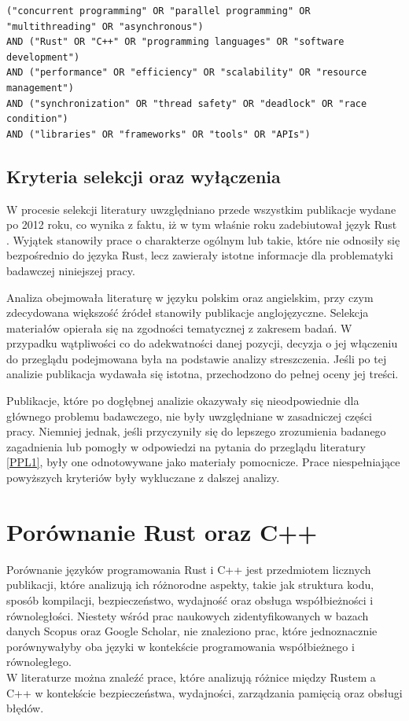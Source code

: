 \lstset{breaklines=true}
\begin{lstlisting}[caption=Kwerenda wygenerowana przez AI, label=AIQuery]
("concurrent programming" OR "parallel programming" OR "multithreading" OR "asynchronous")
AND ("Rust" OR "C++" OR "programming languages" OR "software development")
AND ("performance" OR "efficiency" OR "scalability" OR "resource management")
AND ("synchronization" OR "thread safety" OR "deadlock" OR "race condition")
AND ("libraries" OR "frameworks" OR "tools" OR "APIs")
\end{lstlisting}

\subsection{Kryteria selekcji oraz wyłączenia}
W procesie selekcji literatury uwzględniano przede wszystkim publikacje wydane po 2012 roku, co wynika z faktu, iż w tym właśnie roku zadebiutował język Rust \cite{wikipediaRustprogramming}. Wyjątek stanowiły prace o charakterze ogólnym lub takie, które nie odnosiły się bezpośrednio do języka Rust, lecz zawierały istotne informacje dla problematyki badawczej niniejszej pracy.

Analiza obejmowała literaturę w języku polskim oraz angielskim, przy czym zdecydowana większość źródeł stanowiły publikacje anglojęzyczne. Selekcja materiałów opierała się na zgodności tematycznej z zakresem badań. W przypadku wątpliwości co do adekwatności danej pozycji, decyzja o jej włączeniu do przeglądu podejmowana była na podstawie analizy streszczenia. Jeśli po tej analizie publikacja wydawała się istotna, przechodzono do pełnej oceny jej treści.

Publikacje, które po dogłębnej analizie okazywały się nieodpowiednie dla głównego problemu badawczego, nie były uwzględniane w zasadniczej części pracy. Niemniej jednak, jeśli przyczyniły się do lepszego zrozumienia badanego zagadnienia lub pomogły w odpowiedzi na pytania do przeglądu literatury \ref{PPL1}, były one odnotowywane jako materiały pomocnicze. Prace niespełniające powyższych kryteriów były wykluczane z dalszej analizy.

\section{Porównanie Rust oraz C++}
Porównanie języków programowania Rust i C++ jest przedmiotem licznych publikacji, które analizują ich różnorodne aspekty, takie jak struktura kodu, sposób kompilacji, bezpieczeństwo, wydajność oraz obsługa współbieżności i równoległości. Niestety wśród prac naukowych zidentyfikowanych w bazach danych Scopus oraz Google Scholar, nie znaleziono prac, które jednoznacznie porównywałyby oba języki w kontekście programowania współbieżnego i równoległego.\\
W literaturze można znaleźć prace, które analizują różnice między Rustem a C++ w kontekście bezpieczeństwa, wydajności, zarządzania pamięcią oraz obsługi błędów.

